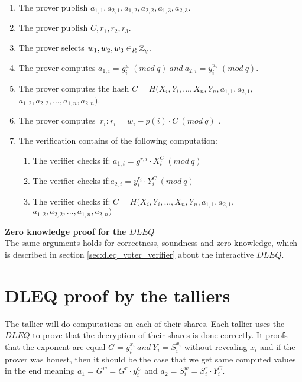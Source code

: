 \begin{enumerate}
    \item The prover publish $a_{1,1},a_{2,1},a_{1,2},a_{2,2},a_{1,3},a_{2,3}$.
    \item The prover publish $C,r_1,r_2,r_3$.
    \item The prover selects  $w_1, w_2,w_3\in_R \mathbb{Z}_q$.
    \item The prover computes $a_{1,i}=g^w_i \ (mod\ q) \ and \ a_{2,i}=y_i^{w_i} \ (mod\ q)$.
    \item The prover computes the hash  $C=H(X_i,Y_i,...,X_n,Y_n,a_{1,1},a_{2,1},$\\
$a_{1,2},a_{2,2},...,a_{1,n},a_{2,n})$.
    \item The prover computes $\ r_i:  r_i=w_i-p(i)  \cdot  C \ (mod\ q)$ .
    \item The verification contains of the following computation:
    \begin{enumerate}        
        \item The verifier checks if: $a_{1,i} = g^{r,i} \cdot X_i^C \ (mod\ q) $
        \item The verifier checks if:$a_{2,i} =y_i^{r_{i}}  \cdot  Y_i^C \ (mod\ q)  $ 
         \item The verifier checks if: $C=H(X_i,Y_i,...,X_n,Y_n,a_{1,1},a_{2,1},$\\
$a_{1,2},a_{2,2},...,a_{1,n},a_{2,n})$
    \end{enumerate}
\end{enumerate}



\noindent
\textbf{Zero knowledge proof for the $DLEQ$}\\
The same arguments holds for correctness, soundness and zero knowledge, which is described in section \ref{sec:dleq_voter_verifier} about the interactive $DLEQ$. 



\chapter{DLEQ proof by the talliers}
\label{sec:dleq_proof_by_the_talliers}
The tallier will do computations on each of their shares. Each tallier uses the $DLEQ$ to prove that the decryption of their shares is done correctly. It proofs that the exponent are equal \begin{math}G = y_i^{x_i}  \ and \ Y_i=S_i^{x_i} \end{math} without revealing \begin{math}x_i \end{math} and if the prover was honest, then it should be the case that we get same computed values in the end meaning \begin{math}a_1=G^w = G^r \cdot y_i^C\end{math} and \begin{math}a_2=S_i^w = S_i^r \cdot Y_i^C\end{math}.\\

